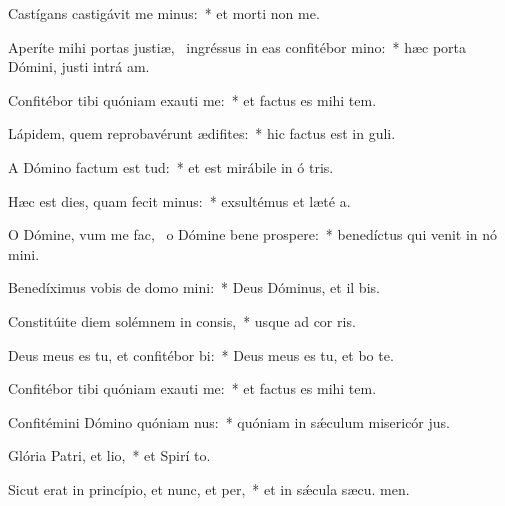 \item Castígans castigávit me minus:~* et morti non  me.
\item Aperíte mihi portas justiæ,~\pscross{} ingréssus in eas confitébor mino:~* hæc porta Dómini, justi intrá  am.
\item Confitébor tibi quóniam exauti me:~* et factus es mihi  tem.
\item Lápidem, quem reprobavérunt ædifites:~* hic factus est in  guli.
\item A Dómino factum est tud:~* et est mirábile in ó tris.
\item Hæc est dies, quam fecit minus:~* exsultémus et læté  a.
\item O Dómine, vum me fac,~\pscross{} o Dómine bene prospere:~* benedíctus qui venit in nó mini.
\item Benedíximus vobis de domo mini:~* Deus Dóminus, et il bis.
\item Constitúite diem solémnem in consis,~* usque ad cor ris.
\item Deus meus es tu, et confitébor bi:~* Deus meus es tu, et bo te.
\item Confitébor tibi quóniam exauti me:~* et factus es mihi  tem.
\item Confitémini Dómino quóniam nus:~* quóniam in sǽculum misericór jus.
\item Glória Patri, et lio,~* et Spirí to.
\item Sicut erat in princípio, et nunc, et per,~* et in sǽcula sæcu. men.
